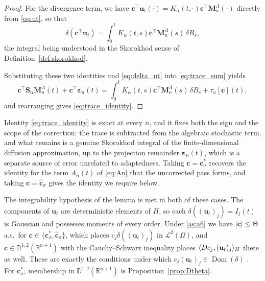 \documentclass[11pt, a4paper]{article}
\theoremstyle{theoremstyle}
\theoremstyle{definitionstyle}
\DeclareMathOperator{\Dom}{\operatorname{Dom}}
\DeclarePairedDelimiter{\abs}{\lvert}{\rvert}
\DeclarePairedDelimiter{\ip}{\langle}{\rangle}
\begin{document}
\begin{proof}
    For the divergence term, we have $\mathbf c^\top \mathbf u_t(\cdot) = K_\alpha(t, \cdot)\mathbf c^\top \mathbf M_n^\Lambda(\cdot)$ directly from \eqref{eq:ut}, so that
    \begin{equation}
        \delta \left ( \mathbf c^\top \mathbf u_t \right ) = \int_0^t K_\alpha(t, s)\mathbf c^\top \mathbf M_n^\Lambda(s)\, \delta B_s,
    \end{equation}
    the integral being understood in the Skorokhod sense of Definition~\ref{def:skorokhod}.

    Substituting these two identities and \eqref{eq:delta_ut} into \eqref{eq:trace_sum} yields
    \begin{equation}
        \mathbf c^\top \mathbf S_\alpha \mathbf M_n^\Lambda(t) + \mathbf c^\top \boldsymbol \varepsilon_n(t) = \int_0^t K_\alpha(t, s)\mathbf c^\top \mathbf M_n^\Lambda(s)\, \delta B_s + \tau_n[\mathbf c](t),
    \end{equation}
    and rearranging gives \eqref{eq:trace_identity}.
\end{proof}

Identity \eqref{eq:trace_identity} is exact at every $n$, and it fixes both the sign and the scope of the correction: the trace is subtracted from the algebraic stochastic term, and what remains is a genuine Skorokhod integral of the finite-dimensional diffusion approximation, up to the projection remainder $\boldsymbol \varepsilon_n(t)$, which is a separate source of error unrelated to adaptedness. Taking $\mathbf c = \mathbf c^*_\sigma$ recovers the identity for the term $A_n(t)$ of \eqref{eq:An} that the uncorrected pass forms, and taking $\mathbf c = \hat{\mathbf c}_\sigma$ gives the identity we require below.

The integrability hypothesis of the lemma is met in both of these cases. The components of $\mathbf u_t$ are deterministic elements of $H$, so each $\delta((\mathbf u_t)_j) = I_j(t)$ is Gaussian and possesses moments of every order. Under \ref{as:a6} we have $\abs{\mathbf c} \leq \Theta$ a.s.\ for $\mathbf c \in \{\mathbf c^*_\sigma, \hat{\mathbf c}_\sigma\}$, which places $c_j\delta((\mathbf u_t)_j)$ in $\mathcal L^2(\Omega)$, and $\mathbf c \in \mathbb D^{1,2}(\mathbb R^{n+1})$ with the Cauchy--Schwarz inequality \cite{rudin1991functional} places $\ip{Dc_j, (\mathbf u_t)_j}_H$ there as well. These are exactly the conditions under which $c_j(\mathbf u_t)_j \in \Dom(\delta)$ \cite{nualart2006malliavin}. For $\mathbf c^*_\sigma$, membership in $\mathbb D^{1,2}(\mathbb R^{n+1})$ is Proposition~\ref{prop:Dtheta}.
\end{document}
